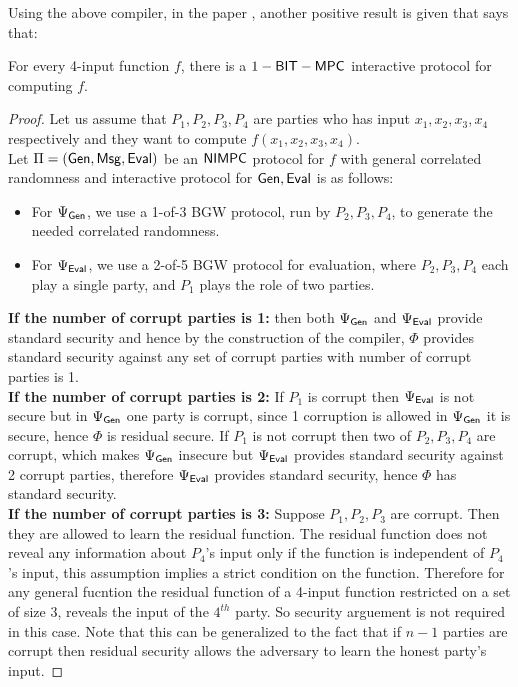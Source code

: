Using the above compiler, in the paper \cite{BITMPC}, another positive result is given that says that: 
\begin{theorem}
For every 4-input function $f$, there is a $1-\mathsf{BIT-MPC}$ interactive protocol for computing $f$.
\end{theorem}
\begin{proof}
Let us assume that $P_1,P_2,P_3,P_4$ are parties who has input $x_1,x_2,x_3,x_4$ respectively and they want to compute $f(x_1,x_2,x_3,x_4)$.\\
Let $\Pi=(\mathsf{Gen}, \mathsf{Msg}, \mathsf{Eval})$ be an $\mathsf{NIMPC}$ protocol for $f$ with general correlated randomness and interactive protocol for $\mathsf{Gen}, \mathsf{Eval}$ is as follows:
	\begin{itemize}
	\item For $\Psi_{\mathsf{Gen}}$, we use a 1-of-3 BGW protocol, run by $P_2, P_3, P_4$, to generate the needed correlated randomness.
	\item For $\Psi_{\mathsf{Eval}}$, we use a 2-of-5 BGW protocol for evaluation, where $P_2,P_3,P_4$ each play a single party, and $P_1$ plays the role of two parties.
	\end{itemize}
	\textbf{If the number of corrupt parties is 1:} then both $\Psi_{\mathsf{Gen}}$ and $\Psi_{\mathsf{Eval}}$ provide standard security and hence by the construction of the compiler, $\Phi$ provides standard security against any set of corrupt parties with number of corrupt parties is 1.\\
	\textbf{If the number of corrupt parties is 2:} If $P_1$ is corrupt then $\Psi_{\mathsf{Eval}}$ is not secure but in $\Psi_{\mathsf{Gen}}$ one party is corrupt, since 1 corruption is allowed in $\Psi_{\mathsf{Gen}}$ it is secure, hence $\Phi$ is residual secure. If $P_1$ is not corrupt then two of $P_2,P_3,P_4$ are corrupt, which makes $\Psi_{\mathsf{Gen}}$ insecure but $\Psi_{\mathsf{Eval}}$ provides standard security against 2 corrupt parties, therefore $\Psi_{\mathsf{Eval}}$ provides standard security, hence $\Phi$ has standard security.\\
	\textbf{If the number of corrupt parties is 3:} Suppose $P_1,P_2,P_3$ are corrupt. Then they are allowed to learn the residual function. The residual function does not reveal any information about $P_4$'s input only if the function is independent of $P_4$'s input, this assumption implies a strict condition on the function. Therefore for any general fucntion the residual function of a 4-input function restricted on a set of size 3, reveals the input of the $4^{th}$ party. So security arguement is not required in this case. Note that this can be generalized to the fact that if $n-1$ parties are corrupt then residual security allows the adversary to learn the honest party's input.
\end{proof}
